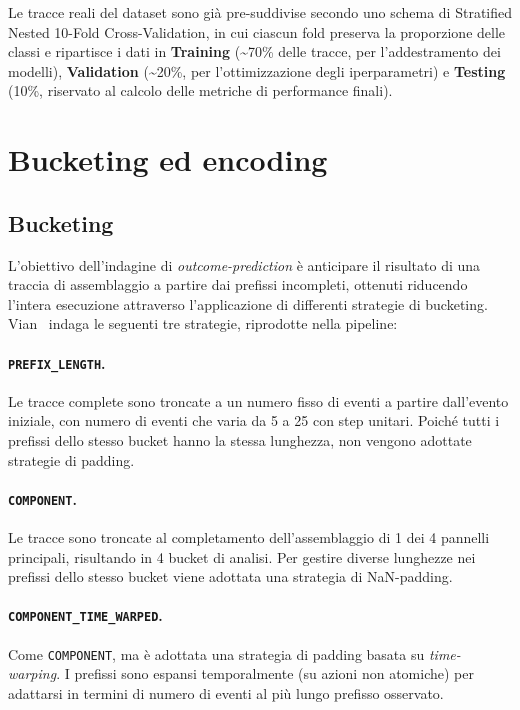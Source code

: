 Le tracce reali del dataset sono già pre-suddivise secondo uno schema di Stratified Nested 10-Fold Cross-Validation, in cui ciascun fold preserva la proporzione delle classi e ripartisce i dati in \textbf{Training} (\textasciitilde 70\% delle tracce, per l'addestramento dei modelli), \textbf{Validation} (\textasciitilde 20\%, per l'ottimizzazione degli iperparametri) e \textbf{Testing} (10\%, riservato al calcolo delle metriche di performance finali).

\section{Bucketing ed encoding}
\label{sec:bucketing_encoding}
\subsection{Bucketing}
\label{subsec:bucketing}
L'obiettivo dell'indagine di \textit{outcome-prediction} è anticipare il risultato di una traccia di assemblaggio a partire dai prefissi incompleti, ottenuti riducendo l'intera esecuzione attraverso l'applicazione di differenti strategie di bucketing. Vian~\cite{ppm-human-centered-vian2024} indaga le seguenti tre strategie, riprodotte nella pipeline:
\paragraph{\texttt{PREFIX\_LENGTH}.}
Le tracce complete sono troncate a un numero fisso di eventi a partire dall'evento iniziale, con numero di eventi che varia da 5 a 25 con step unitari. Poiché tutti i prefissi dello stesso bucket hanno la stessa lunghezza, non vengono adottate strategie di padding.

\paragraph{\texttt{COMPONENT}.}
Le tracce sono troncate al completamento dell'assemblaggio di 1 dei 4 pannelli principali, risultando in 4 bucket di analisi. Per gestire diverse lunghezze nei prefissi dello stesso bucket viene adottata una strategia di NaN-padding.

\paragraph{\texttt{COMPONENT\_TIME\_WARPED}.}
Come \texttt{COMPONENT}, ma è adottata una strategia di padding basata su \textit{time-warping}. I prefissi sono espansi temporalmente (su azioni non atomiche) per adattarsi in termini di numero di eventi al più lungo prefisso osservato.

